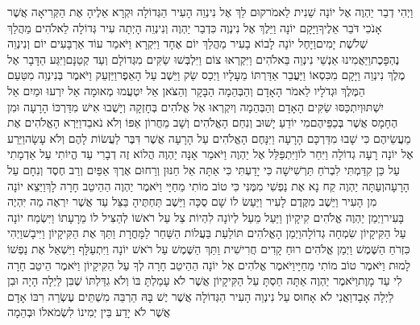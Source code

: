 \documentclass[../main/main.tex]{subfiles}
\begin{document}
\begin{multicols*}{\ncols}
וַיְהִי דְבַר יַהְוֶה אֶל יוֹנָה שֵׁנִית לֵאמֹר\PreVerseSpace{}קוּם לֵךְ אֶל נִינְוֵה הָעִיר הַגְּדוֹלָה וּקְרָא אֵלֶיהָ אֶת הַקְּרִיאָה אֲשֶׁר אָנֹכִי דֹּבֵר אֵלֶיךָ\PreVerseSpace{}וַיָּקָם יוֹנָה וַיֵּלֶךְ אֶל נִינְוֶה כִּדְבַר יַהְוֶה וְנִינְוֵה הָיְתָה עִיר גְּדוֹלָה לֵאלֹהִים מַהֲלַךְ שְׁלֹשֶׁת יָמִים\PreVerseSpace{}וַיָּחֶל יוֹנָה לָבוֹא בָעִיר מַהֲלַךְ יוֹם אֶחָד וַיִּקְרָא וַיֹּאמַר עוֹד אַרְבָּעִים יוֹם וְנִינְוֵה נֶהְפָּכֶת\PreVerseSpace{}וַיַּאֲמִינוּ אַנְשֵׁי נִינְוֵה בֵּאלֹהִים וַיִּקְרְאוּ צוֹם וַיִּלְבְּשׁוּ שַׂקִּים מִגְּדוֹלָם וְעַד קְטַנָּם\PreVerseSpace{}וַיִּגַּע הַדָּבָר אֶל מֶלֶךְ נִינְוֵה וַיָּקָם מִכִּסְאוֹ וַיַּעֲבֵר אַדַּרְתּוֹ מֵעָלָיו וַיְכַס שַׂק וַיֵּשֶׁב עַל הָאֵפֶר\PreVerseSpace{}וַיַּזְעֵק וַיֹּאמֶר בְּנִינְוֵה מִטַּעַם הַמֶּלֶךְ וּגְדֹלָיו לֵאמֹר הָאָדָם וְהַבְּהֵמָה הַבָּקָר וְהַצֹּאן אַל יִטְעֲמוּ מְאוּמָה אַל יִרְעוּ וּמַיִם אַל יִשְׁתּוּ\PreVerseSpace{}וְיִתְכַּסּוּ שַׂקִּים הָאָדָם וְהַבְּהֵמָה וְיִקְרְאוּ אֶל אֱלֹהִים בְּחָזְקָה וְיָשֻׁבוּ אִישׁ מִדַּרְכּוֹ הָרָעָה וּמִן הֶחָמָס אֲשֶׁר בְּכַפֵּיהֶם\PreVerseSpace{}מִי יוֹדֵעַ יָשׁוּב וְנִחַם הָאֱלֹהִים וְשָׁב מֵחֲרוֹן אַפּוֹ וְלֹא נֹאבֵד\PreVerseSpace{}וַיַּרְא הָאֱלֹהִים אֶת מַעֲשֵׂיהֶם כִּי שָׁבוּ מִדַּרְכָּם הָרָעָה וַיִּנָּחֶם הָאֱלֹהִים עַל הָרָעָה אֲשֶׁר דִּבֶּר לַעֲשׂוֹת לָהֶם וְלֹא עָשָׂה\PreChapterSpace{}וַיֵּרַע אֶל יוֹנָה רָעָה גְדוֹלָה וַיִּחַר לוֹ\PreVerseSpace{}וַיִּתְפַּלֵּל אֶל יַהְוֶה וַיֹּאמַר אָנָּה יַהְוֶה הֲלוֹא זֶה דְבָרִי עַד הֱיוֹתִי עַל אַדְמָתִי עַל כֵּן קִדַּמְתִּי לִבְרֹחַ תַּרְשִׁישָׁה כִּי יָדַעְתִּי כִּי אַתָּה אֵל חַנּוּן וְרַחוּם אֶרֶךְ אַפַּיִם וְרַב חֶסֶד וְנִחָם עַל הָרָעָה\PreVerseSpace{}וְעַתָּה יַהְוֶה קַח נָא אֶת נַפְשִׁי מִמֶּנִּי כִּי טוֹב מוֹתִי מֵחַיָּי \ClosedSection{}וַיֹּאמֶר יַהְוֶה הַהֵיטֵב חָרָה לָךְ\PreVerseSpace{}וַיֵּצֵא יוֹנָה מִן הָעִיר וַיֵּשֶׁב מִקֶּדֶם לָעִיר וַיַּעַשׂ לוֹ שָׁם סֻכָּה וַיֵּשֶׁב תַּחְתֶּיהָ בַּצֵּל עַד אֲשֶׁר יִרְאֶה מַה יִּהְיֶה בָּעִיר\PreVerseSpace{}וַיְמַן יַהְוֶה אֱלֹהִים קִיקָיוֹן וַיַּעַל מֵעַל לְיוֹנָה לִהְיוֹת צֵל עַל רֹאשׁוֹ לְהַצִּיל לוֹ מֵרָעָתוֹ וַיִּשְׂמַח יוֹנָה עַל הַקִּיקָיוֹן שִׂמְחָה גְדוֹלָה\PreVerseSpace{}וַיְמַן הָאֱלֹהִים תּוֹלַעַת בַּעֲלוֹת הַשַּׁחַר לַמָּחֳרָת וַתַּךְ אֶת הַקִּיקָיוֹן וַיִּיבָשׁ\PreVerseSpace{}וַיְהִי כִּזְרֹחַ הַשֶּׁמֶשׁ וַיְמַן אֱלֹהִים רוּחַ קָדִים חֲרִישִׁית וַתַּךְ הַשֶּׁמֶשׁ עַל רֹאשׁ יוֹנָה וַיִּתְעַלָּף וַיִּשְׁאַל אֶת נַפְשׁוֹ לָמוּת וַיֹּאמֶר טוֹב מוֹתִי מֵחַיָּי\PreVerseSpace{}וַיֹּאמֶר אֱלֹהִים אֶל יוֹנָה הַהֵיטֵב חָרָה לְךָ עַל הַקִּיקָיוֹן וַיֹּאמֶר הֵיטֵב חָרָה לִי עַד מָוֶת\PreVerseSpace{}וַיֹּאמֶר יַהְוֶה אַתָּה חַסְתָּ עַל הַקִּיקָיוֹן אֲשֶׁר לֹא עָמַלְתָּ בּוֹ וְלֹא גִדַּלְתּוֹ שֶׁבִּן לַיְלָה הָיָה וּבִן לַיְלָה אָבָד\PreVerseSpace{}וַאֲנִי לֹא אָחוּס עַל נִינְוֵה הָעִיר הַגְּדוֹלָה אֲשֶׁר יֶשׁ בָּהּ הַרְבֵּה מִשְׁתֵּים עֶשְׂרֵה רִבּוֹ אָדָם אֲשֶׁר לֹא יָדַע בֵּין יְמִינוֹ לִשְׂמֹאלוֹ וּבְהֵמָה\par
\end{multicols*}
\end{document}
